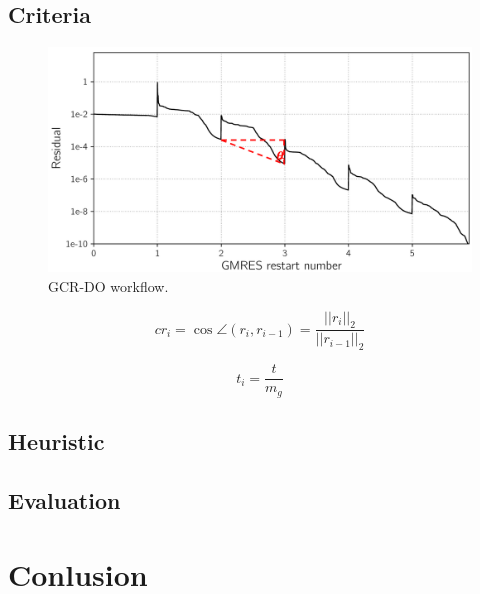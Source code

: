 \subsection{Criteria}

\begin{figure}[htbp]
	\centering
	\includegraphics[width=0.99\linewidth]{fig/convergence_tuning.pdf}
	\caption{GCR-DO workflow.}
	\label{fig:cos}
\end{figure}

\begin{equation}
cr_i=\cos\angle(r_i,r_{i-1})=\frac{||r_i||_2}{||r_{i-1}||_2}
\end{equation}


\begin{equation}
t_i=\frac{t}{m_g}
\end{equation}

\subsection{Heuristic}

\subsection{Evaluation}

\section{Conlusion}

\clearemptydoublepage